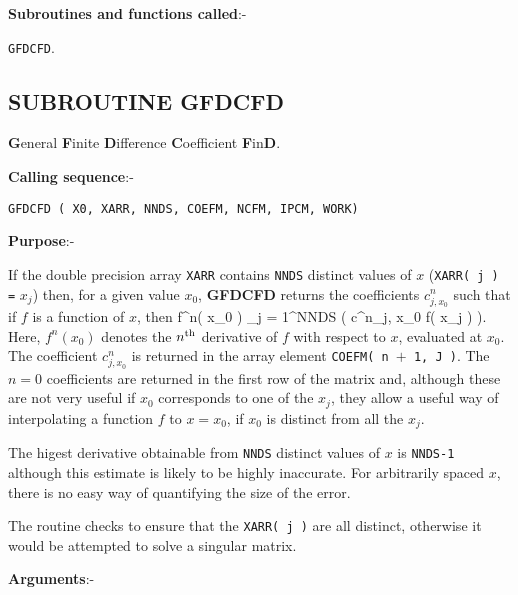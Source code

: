 {\bf Subroutines and functions called}:- \newline

\verb+GFDCFD+.

\clearpage
\subsection{SUBROUTINE GFDCFD}
\label{sec:gfdcfdinfo}

{\bf G}eneral {\bf F}inite {\bf D}ifference
{\bf C}oefficient {\bf F}in{\bf D}. \newline

{\bf Calling sequence}:-
\begin{verbatim}
GFDCFD ( X0, XARR, NNDS, COEFM, NCFM, IPCM, WORK)
\end{verbatim}

{\bf Purpose}:- \newline

If the double precision array \verb+XARR+ contains
\verb+NNDS+ distinct values of $x$  \newline
(\verb+XARR( j ) =+ $x_j$) then, for a
given value $x_0$, {\bf GFDCFD } returns the coefficients
$c^n_{j, x_0}$ such that if $f$ is a function of $x$,
then
\bed
f^n( x_0 ) \approx  \sum_{j = 1}^{\rm NNDS}
\left(
c^n_{j, x_0} f( x_j )
\right).
\eed
Here, $f^n( x_0 )$ denotes the $n^{\rm th}$ derivative
of $f$ with respect to $x$, evaluated at $x_0$.
The coefficient $c^n_{j, x_0}$ is returned in
the array element
\verb+COEFM( n +$+$\verb+ 1, J )+.
The $n=0$ coefficients are returned in the first
row of the matrix and, although these are not
very useful if $x_0$ corresponds to one of the
$x_j$, they allow a useful way of interpolating
a function $f$ to $x=x_0$, if $x_0$ is distinct
from all the $x_j$.

The higest derivative obtainable from
\verb+NNDS+ distinct values of $x$ is \verb+NNDS-1+
although this estimate is likely to be highly
inaccurate. For arbitrarily spaced $x$, there is
no easy way of quantifying the size of the error.

The routine checks to ensure that the
\verb+XARR( j )+ are all distinct, otherwise
it would be attempted to solve a singular matrix.


{\bf Arguments}:- \newline

